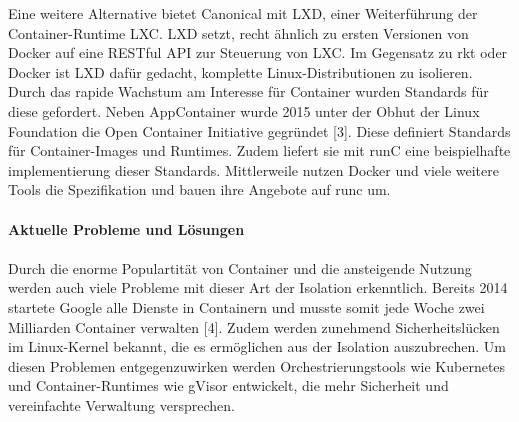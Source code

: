 \begin{multicols}{2}
Eine weitere Alternative bietet Canonical mit LXD, einer Weiterführung der Container-Runtime LXC. LXD setzt, recht ähnlich zu ersten Versionen von Docker auf eine RESTful API zur Steuerung von LXC. Im Gegensatz zu rkt oder Docker ist LXD dafür gedacht, komplette Linux-Distributionen zu isolieren.
Durch das rapide Wachstum am Interesse für Container wurden Standards für diese gefordert. Neben AppContainer wurde 2015 unter der Obhut der Linux Foundation die Open Container Initiative gegründet [3]. Diese definiert Standards für Container-Images und Runtimes. Zudem liefert sie mit runC eine beispielhafte implementierung dieser Standards. Mittlerweile nutzen Docker und viele weitere Tools die Spezifikation und bauen ihre Angebote auf runc um.
\\
\\ \textbf{Aktuelle Probleme und Lösungen}
\\
\\
Durch die enorme Populartität von Container und die ansteigende Nutzung werden auch viele Probleme mit dieser Art der Isolation erkenntlich. Bereits 2014 startete Google alle Dienste in Containern und musste somit jede Woche zwei Milliarden Container verwalten [4]. Zudem werden zunehmend Sicherheitslücken im Linux-Kernel bekannt, die es ermöglichen aus der Isolation auszubrechen. Um diesen Problemen entgegenzuwirken werden Orchestrierungstools wie Kubernetes und Container-Runtimes wie gVisor entwickelt, die mehr Sicherheit und vereinfachte Verwaltung versprechen.


\end{multicols}
\def\footnoterule{}
